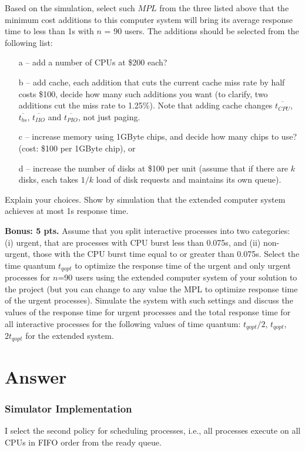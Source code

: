 \documentclass[12pt,letterpaper]{article}
\begin{document}
Based on the simulation, select such $MPL$ from the three listed above that the minimum
cost additions to this computer system will bring its average response time to less
than 1s with $n$ = 90 users. The additions should be selected from the following list:
\begin{itemize}
\item[a] -- add a number of CPUs at \$200 each?
\item[b] -- add cache, each addition that cuts the current cache miss rate by half costs \$100,
decide how many such additions you want (to clarify, two additions cut the miss
rate to 1.25\%). Note that adding cache changes $\overline{t_{CPU}}$, $\overline{t_{bs}}$, $\overline{t_{IIO}}$ and $\overline{t_{PIO}}$, not just paging.
\item[c] -- increase memory using 1GByte chips, and decide how many chips to use? (cost: \$100
per 1GByte chip), or
\item[d] -- increase the number of disks at \$100 per unit (assume that if there are $k$ disks, each
takes $1/k$ load of disk requests and maintains its own queue).
\end{itemize}
Explain your choices. Show by simulation that the extended computer system achieves
at most 1s response time.

{\bf Bonus: 5 pts.} Assume that you split interactive processes into two categories: (i)
urgent, that are processes with CPU burst less than 0.075s, and (ii) non-urgent, those
with the CPU burst time equal to or greater than 0.075s. Select the time quantum $t_{qopt}$
to optimize the response time of the urgent and only urgent processes for $n$=90 users
using the extended computer system of your solution to the project (but you can change
to any value the MPL to optimize response time of the urgent processes). Simulate the
system with such settings and discuss the values of the response time for urgent processes
and the total response time for all interactive processes for the following values of time
quantum: $t_{qopt}/2$, $t_{qopt}$, $2t_{qopt}$ for the extended system.

\part*{Answer}
\section{Simulator Implementation}
I select the second policy for
scheduling processes, i.e., all processes execute on all CPUs in FIFO order from the ready queue.
\end{document}
